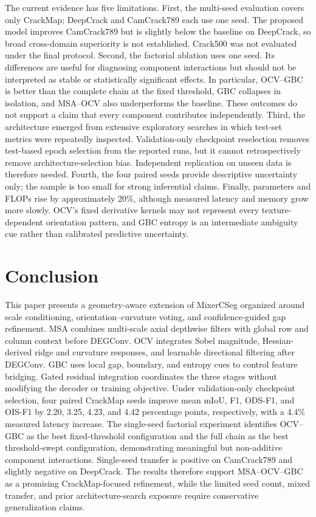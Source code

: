 \documentclass[preprint,12pt]{elsarticle}
\newcommand{\method}{MSA--OCV--GBC}
\begin{document}
The current evidence has five limitations. First, the multi-seed evaluation covers only CrackMap; DeepCrack and CamCrack789 each use one seed. The proposed model improves CamCrack789 but is slightly below the baseline on DeepCrack, so broad cross-domain superiority is not established. Crack500 was not evaluated under the final protocol. Second, the factorial ablation uses one seed. Its differences are useful for diagnosing component interactions but should not be interpreted as stable or statistically significant effects. In particular, OCV--GBC is better than the complete chain at the fixed threshold, GBC collapses in isolation, and MSA--OCV also underperforms the baseline. These outcomes do not support a claim that every component contributes independently. Third, the architecture emerged from extensive exploratory searches in which test-set metrics were repeatedly inspected. Validation-only checkpoint reselection removes test-based epoch selection from the reported runs, but it cannot retrospectively remove architecture-selection bias. Independent replication on unseen data is therefore needed. Fourth, the four paired seeds provide descriptive uncertainty only; the sample is too small for strong inferential claims. Finally, parameters and FLOPs rise by approximately 20\%, although measured latency and memory grow more slowly. OCV's fixed derivative kernels may not represent every texture-dependent orientation pattern, and GBC entropy is an intermediate ambiguity cue rather than calibrated predictive uncertainty.

\section{Conclusion}

This paper presents a geometry-aware extension of MixerCSeg organized around scale conditioning, orientation--curvature voting, and confidence-guided gap refinement. MSA combines multi-scale axial depthwise filters with global row and column context before DEGConv. OCV integrates Sobel magnitude, Hessian-derived ridge and curvature responses, and learnable directional filtering after DEGConv. GBC uses local gap, boundary, and entropy cues to control feature bridging. Gated residual integration coordinates the three stages without modifying the decoder or training objective. Under validation-only checkpoint selection, four paired CrackMap seeds improve mean mIoU, F1, ODS-F1, and OIS-F1 by 2.20, 3.25, 4.23, and 4.42 percentage points, respectively, with a 4.4\% measured latency increase. The single-seed factorial experiment identifies OCV--GBC as the best fixed-threshold configuration and the full chain as the best threshold-swept configuration, demonstrating meaningful but non-additive component interactions. Single-seed transfer is positive on CamCrack789 and slightly negative on DeepCrack. The results therefore support \method{} as a promising CrackMap-focused refinement, while the limited seed count, mixed transfer, and prior architecture-search exposure require conservative generalization claims.
\end{document}
